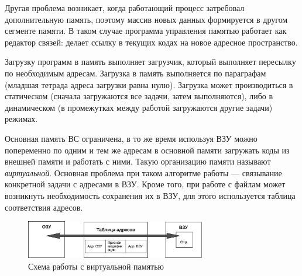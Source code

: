 \documentclass[unicode, 12pt, a4paper, oneside]{article}
\begin{document}
Другая проблема возникает, когда работающий процесс затребовал дополнительную память, поэтому массив новых данных формируется в другом сегменте памяти. В таком случае программа управления памятью работает как редактор связей: делает ссылку в текущих кодах на новое адресное пространство.

Загрузку программ в память выполняет загрузчик, который выполняет пересылку по необходимым адресам. Загрузка в память выполняется по параграфам (младшая тетрада адреса загрузки равна нулю). Загрузка может производиться в статическом (сначала загружаются все задачи, затем выполняются), либо в динамическом (в промежутках между работой загружаются другие задачи) режимах.

Основная память ВС ограничена, в то же время используя ВЗУ можно попеременно по одним и тем же адресам в основной памяти загружать коды из внешней памяти и работать с ними. Такую организацию памяти называют \textit{виртуальной}. Основная проблема при таком алгоритме работы — связывание конкретной задачи с адресами в ВЗУ. Кроме того, при работе с файлам может возникнуть необходимость сохранения их в ВЗУ, для этого используется таблица соответствия адресов.

\begin{figure}[H]
\centering
\includegraphics[width=0.7\textwidth]{160_virtual_memory.pdf}
\caption{Схема работы с виртуальной памятью}
\end{figure}
\end{document}
